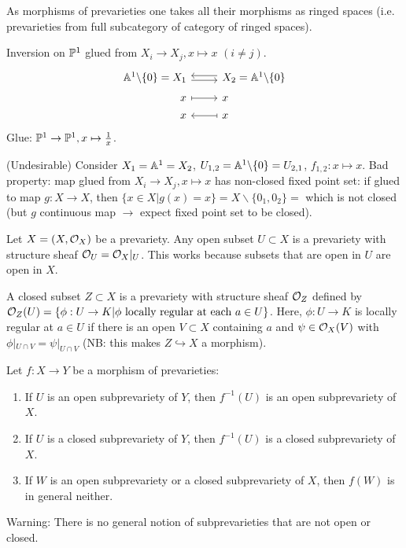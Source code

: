 \documentclass[a4paper,11pt]{article}
\begin{document}
			As morphisms of prevarieties one takes all their morphisms as ringed spaces (i.e. prevarieties from full subcategory of category of ringed spaces).

			\begin{eg}
				Inversion on $\P^1$ glued from $X_i\rightarrow X_j,x\mapsto x$ $(i\neq j)$.
				\begin{equation*}
					\begin{tikzcd}[row sep=tiny,
						/tikz/column 1/.append style={nodes={anchor=base east}},
						/tikz/column 2/.append style={nodes={anchor=base west}}]
						\AA^1\backslash\{0\}=X_1\ar[r,shift right=.5ex] & \ar[l,shift right=.5ex] X_2=\AA^1\backslash\{0\}\\
						x\ar[r,mapsto] & x\\
						x & \ar[l,mapsto] x
					\end{tikzcd}
				\end{equation*}
				Glue: $\P^1\rightarrow\P^1,x\mapsto\frac{1}{x}$.
			\end{eg}

			\begin{eg}
				(Undesirable) Consider $X_1=\AA^1=X_2$, $U_{1,2}=\AA^1\backslash\{0\}=U_{2,1}$, $f_{1,2}:x\mapsto x$. Bad property: map glued from $X_i\rightarrow X_j,x\mapsto x$ has non-closed fixed point set: if glued to map $g:X\rightarrow X$, then $\{x\in X|g(x)=x\}=X\backslash\{0_1,0_2\}=$  which is not closed (but $g$ continuous map $\rightarrow$ expect fixed point set to be closed).
			\end{eg}

			Let $X=(X,\O_X)$ be a prevariety. Any open subset $U\subset X$ is a prevariety with structure sheaf $\O_U=\O_X|_U$. This works because subsets that are open in $U$ are open in $X$.

			\begin{defi}\label{def--subprevarieties}
				A closed subset $Z\subset X$ is a prevariety with structure sheaf $\O_Z$ defined by $\O_Z(U)=\{\phi:U\rightarrow K|\phi\text{ locally regular at each }a\in U\}$. Here, $\phi:U\rightarrow K$ is locally regular at $a\in U$ if there is an open $V\subset X$ containing $a$ and $\psi\in\O_X(V)$ with $\phi|_{U\cap V}=\psi|_{U\cap V}$ (NB: this makes $Z\hookrightarrow X$ a morphism).
			\end{defi}

			\noindent Let $f:X\rightarrow Y$ be a morphism of prevarieties:
			\begin{enumerate}
				\item If $U$ is an open subprevariety of $Y$, then $f^{-1}(U)$ is an open subprevariety of $X$.
				\item If $U$ is a closed subprevariety of $Y$, then $f^{-1}(U)$ is a closed subprevariety of $X$.
				\item If $W$ is an open subprevariety or a closed subprevariety of $X$, then $f(W)$ is in general neither.
			\end{enumerate}
			\noindent Warning: There is no general notion of subprevarieties that are not open or closed.
\end{document}

